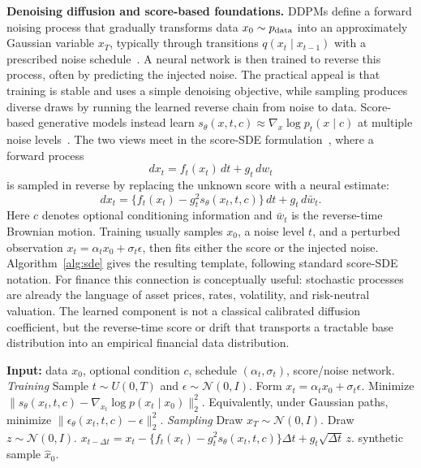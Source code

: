 \documentclass[sigconf,nonacm]{acmart}
\begin{document}
\textbf{Denoising diffusion and score-based foundations.}
DDPMs define a forward noising process that gradually transforms data
$x_0 \sim p_{\rm data}$ into an approximately Gaussian variable $x_T$,
typically through transitions $q(x_t \mid x_{t-1})$ with a prescribed noise
schedule~\cite{ho2020ddpm}. A neural network is then trained to reverse this
process, often by predicting the injected noise. The practical appeal is that training is stable and uses a
simple denoising objective, while sampling produces diverse draws by running the
learned reverse chain from noise to data. Score-based generative models instead
learn $s_\theta(x,t,c)\approx \nabla_x \log p_t(x\mid c)$ at multiple noise
levels~\cite{song2019ncsn}. The two views meet in the score-SDE formulation~\cite{song2021sde},
where a forward process
\begin{equation}
  d x_t = f_t(x_t)\,dt + g_t\,d w_t
\end{equation}
is sampled in reverse by replacing the unknown score with a neural estimate:
\begin{equation}
  d x_t = \{f_t(x_t)-g_t^2 s_\theta(x_t,t,c)\}\,dt + g_t\,d\bar{w}_t.
\end{equation}
Here $c$ denotes optional conditioning information and $\bar{w}_t$ is the
reverse-time Brownian motion. Training usually samples
$x_0$, a noise level $t$, and a perturbed observation
$x_t=\alpha_t x_0+\sigma_t\epsilon$, then fits either the score or the injected
noise. Algorithm~\ref{alg:sde} gives the resulting template, following standard
score-SDE notation. For finance this connection is
conceptually useful: stochastic processes are already the language of asset
prices, rates, volatility, and risk-neutral valuation. The learned component is
not a classical calibrated diffusion coefficient, but the reverse-time score or
drift that transports a tractable base distribution into an empirical financial
data distribution.

\begin{algorithm}[t]
\caption{Score-SDE diffusion: training and sampling}
\label{alg:sde}
\small
\begin{algorithmic}[1]
\State \textbf{Input:} data $x_0$, optional condition $c$, schedule $(\alpha_t,\sigma_t)$, score/noise network.
\Statex \textit{Training}
  \State Sample $t\sim U(0,T)$ and $\epsilon\sim\mathcal{N}(0,I)$.
  \State Form $x_t=\alpha_t x_0+\sigma_t\epsilon$.
  \State Minimize $\|s_\theta(x_t,t,c)-\nabla_{x_t}\log p(x_t\mid x_0)\|_2^2$.
  \State Equivalently, under Gaussian paths, minimize $\|\epsilon_\theta(x_t,t,c)-\epsilon\|_2^2$.
\EndFor
\Statex \textit{Sampling}
\State Draw $x_T\sim\mathcal{N}(0,I)$.
  \State Draw $z\sim\mathcal{N}(0,I)$.
  \State $x_{t-\Delta t}=x_t-\{f_t(x_t)-g_t^2 s_\theta(x_t,t,c)\}\Delta t+g_t\sqrt{\Delta t}\,z$.
\EndFor
\State \Return synthetic sample $\hat{x}_0$.
\end{algorithmic}
\end{algorithm}
\end{document}
